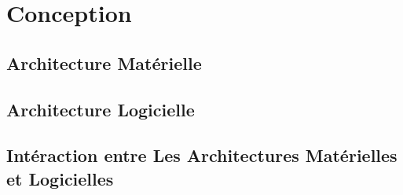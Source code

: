 \chapter{Conception}

\section{Architecture Matérielle}

\section{Architecture Logicielle}

\section[Intéraction entre Les Deux]{Intéraction entre Les Architectures Matérielles et Logicielles}